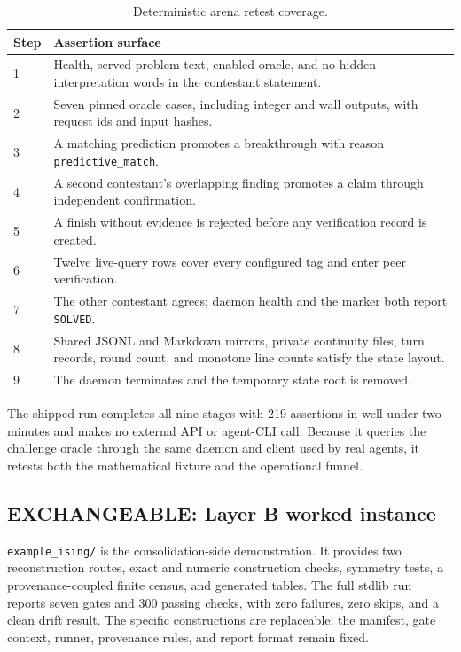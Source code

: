 \documentclass[11pt]{article}
\newcommand{\code}[1]{\texttt{#1}}
\newcommand{\exchangeable}{\textbf{\textcolor{InstanceLine}{EXCHANGEABLE}}}
\begin{document}
\begin{table}[htbp]
\centering
\small
\caption{Deterministic arena retest coverage.}
\label{tab:smoke}
\begin{tabularx}{\textwidth}{@{}p{}Y@{}}
\toprule
Step & Assertion surface \\
 & Health, served problem text, enabled oracle, and no hidden interpretation
words in the contestant statement. \\
2 & Seven pinned oracle cases, including integer and wall outputs, with
request ids and input hashes. \\
3 & A matching prediction promotes a breakthrough with reason
\code{predictive\_match}. \\
4 & A second contestant's overlapping finding promotes a claim through
independent confirmation. \\
5 & A finish without evidence is rejected before any verification record is
created. \\
6 & Twelve live-query rows cover every configured tag and enter peer
verification. \\
7 & The other contestant agrees; daemon health and the marker both report
\code{SOLVED}. \\
8 & Shared JSONL and Markdown mirrors, private continuity files, turn records,
round count, and monotone line counts satisfy the state layout. \\
9 & The daemon terminates and the temporary state root is removed. \\
\bottomrule
\end{tabularx}
\end{table}

The shipped run completes all nine stages with 219 assertions in well under
two minutes and makes no external API or agent-CLI call.  Because it queries
the challenge oracle through the same daemon and client used by real agents,
it retests both the mathematical fixture and the operational funnel.

\subsection{\exchangeable: Layer B worked instance}

\code{example\_ising/} is the consolidation-side demonstration.  It provides
two reconstruction routes, exact and numeric construction checks, symmetry
tests, a provenance-coupled finite census, and generated tables.  The full
stdlib run reports seven gates and 300 passing checks, with zero failures,
zero skips, and a clean drift result.  The specific constructions are
replaceable; the manifest, gate context, runner, provenance rules, and report
format remain fixed.
\end{document}
